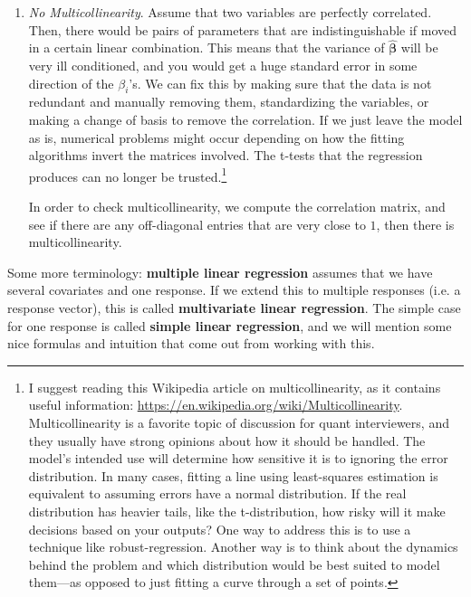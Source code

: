 \begin{enumerate}
  \item \textit{No Multicollinearity}. Assume that two variables are perfectly correlated. Then, there would be pairs of parameters that are indistinguishable if moved in a certain linear combination. This means that the variance of $\hat{\boldsymbol{\beta}}$ will be very ill conditioned, and you would get a huge standard error in some direction of the $\beta_i$'s. We can fix this by making sure that the data is not redundant and manually removing them, standardizing the variables, or making a change of basis to remove the correlation. If we just leave the model as is, numerical problems might occur depending on how the fitting algorithms invert the matrices involved. The t-tests that the regression produces can no longer be trusted.\footnote{I suggest reading this Wikipedia article on multicollinearity, as it contains useful information: \url{https://en.wikipedia.org/wiki/Multicollinearity}. Multicollinearity is a favorite topic of discussion for quant interviewers, and they usually have strong opinions about how it should be handled. The model's intended use will determine how sensitive it is to ignoring the error distribution. In many cases, fitting a line using least-squares estimation is equivalent to assuming errors have a normal distribution. If the real distribution has heavier tails, like the t-distribution, how risky will it make decisions based on your outputs? One way to address this is to use a technique like robust-regression. Another way is to think about the dynamics behind the problem and which distribution would be best suited to model them---as opposed to just fitting a curve through a set of points.} 

  In order to check multicollinearity, we compute the correlation matrix, and see if there are any off-diagonal entries that are very close to $1$, then there is multicollinearity. 
\end{enumerate}

Some more terminology: \textbf{multiple linear regression} assumes that we have several covariates and one response. If we extend this to multiple responses (i.e. a response vector), this is called \textbf{multivariate linear regression}. The simple case for one response is called \textbf{simple linear regression}, and we will mention some nice formulas and intuition that come out from working with this. 

